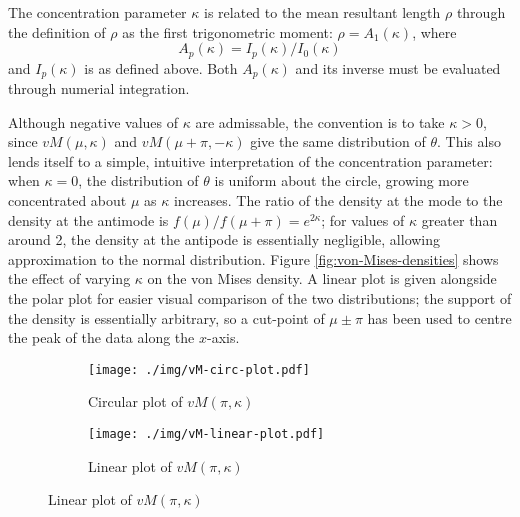 \documentclass[../../ArchStats.tex]{subfiles}
\begin{document}
The concentration parameter $\kappa$ is related to the mean resultant length $\rho$ through the definition of $\rho$ as the first trigonometric moment: $\rho = A_1(\kappa)$, where
	\begin{equation}
	\label{eq:A1}
	A_p(\kappa) = I_p(\kappa)/I_0(\kappa)
	\end{equation}
and $I_p(\kappa)$ is as defined above. Both $A_p(\kappa)$ and its inverse must be evaluated through numerial integration.

Although negative values of $\kappa$ are admissable, the convention is to take $\kappa > 0$, since $vM(\mu, \kappa)$ and $vM(\mu + \pi, -\kappa)$ give the same distribution of $\theta$. This also lends itself to a simple, intuitive interpretation of the concentration parameter: when $\kappa = 0$, the distribution of $\theta$ is uniform about the circle, growing more concentrated about $\mu$ as $\kappa$ increases.  The ratio of the density at the mode to the density at the antimode is $f(\mu) / f(\mu + \pi) = e^{2\kappa}$; for values of $\kappa$ greater than around 2, the density at the antipode is essentially negligible, allowing approximation to the normal distribution. Figure \ref{fig:von-Mises-densities} shows the effect of varying $\kappa$ on the von Mises density. A linear plot is given alongside the polar plot for easier visual comparison of the two distributions; the support of the density is essentially arbitrary, so a cut-point of $\mu \pm \pi$ has been used to centre the peak of the data along the $x$-axis.
 
\begin{figure}[!h]
\centering
\caption{von Mises densities with $\mu = \pi$ and varying $\kappa$.}
\label{fig:von-Mises-densities}
%
\begin{subfigure}[t]{0.4\textwidth}
\centering
\caption{Circular plot of $vM(\pi, \kappa)$}
\texttt{[image: ./img/vM-circ-plot.pdf]}
\end{subfigure}
%
\begin{subfigure}[t]{0.4\textwidth}
\centering
\caption{Linear plot of $vM(\pi, \kappa)$}
\texttt{[image: ./img/vM-linear-plot.pdf]}
\end{subfigure}
%
\end{figure}

\end{document}
